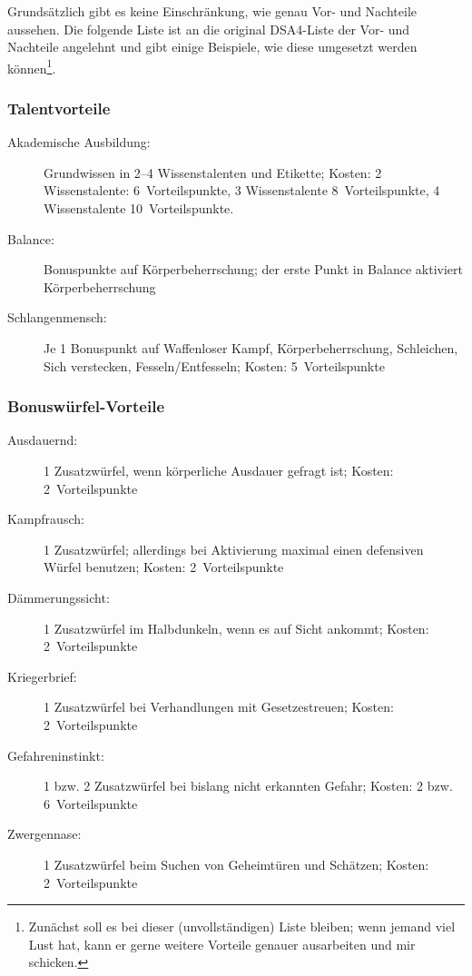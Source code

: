 Grundsätzlich gibt es keine Einschränkung, wie genau Vor- und Nachteile aussehen. Die folgende Liste ist an die original DSA4-Liste der Vor- und Nachteile angelehnt und gibt einige Beispiele, wie diese umgesetzt werden können\footnote{Zunächst soll es bei dieser (unvollständigen) Liste bleiben; wenn jemand viel Lust hat, kann er gerne weitere Vorteile genauer ausarbeiten und mir schicken.}.

\subsubsection{Talentvorteile}
\begin{description}
  \item[Akademische Ausbildung:] Grundwissen in 2--4 Wissenstalenten und Etikette; Kosten: 2 Wissenstalente: 6~Vorteilspunkte, 3 Wissenstalente 8~Vorteilspunkte, 4 Wissenstalente 10~Vorteilspunkte.
  \item[Balance:] Bonuspunkte auf Körperbeherrschung; der erste Punkt in Balance aktiviert Körperbeherrschung
  \item[Schlangenmensch:]  Je 1 Bonuspunkt auf Waffenloser Kampf, Körperbeherrschung, Schleichen, Sich verstecken, Fesseln/Entfesseln; Kosten: 5~Vorteilspunkte
\end{description}

\subsubsection{Bonuswürfel-Vorteile}
\begin{description}
  \item[Ausdauernd:] 1 Zusatzwürfel, wenn körperliche Ausdauer gefragt ist; Kosten: 2~Vorteilspunkte
  \item[Kampfrausch:] 1 Zusatzwürfel; allerdings bei Aktivierung maximal einen defensiven Würfel benutzen; Kosten: 2~Vorteilspunkte
  \item[Dämmerungssicht:] 1 Zusatzwürfel im Halbdunkeln, wenn es auf Sicht ankommt; Kosten: 2~Vorteilspunkte
  \item[Kriegerbrief:] 1 Zusatzwürfel bei Verhandlungen mit Gesetzestreuen; Kosten: 2~Vorteilspunkte
  \item[Gefahreninstinkt:] 1 bzw. 2 Zusatzwürfel bei bislang nicht erkannten Gefahr; Kosten: 2 bzw. 6~Vorteilspunkte
  \item[Zwergennase:] 1 Zusatzwürfel beim Suchen von Geheimtüren und Schätzen; Kosten: 2~Vorteilspunkte
\end{description}


